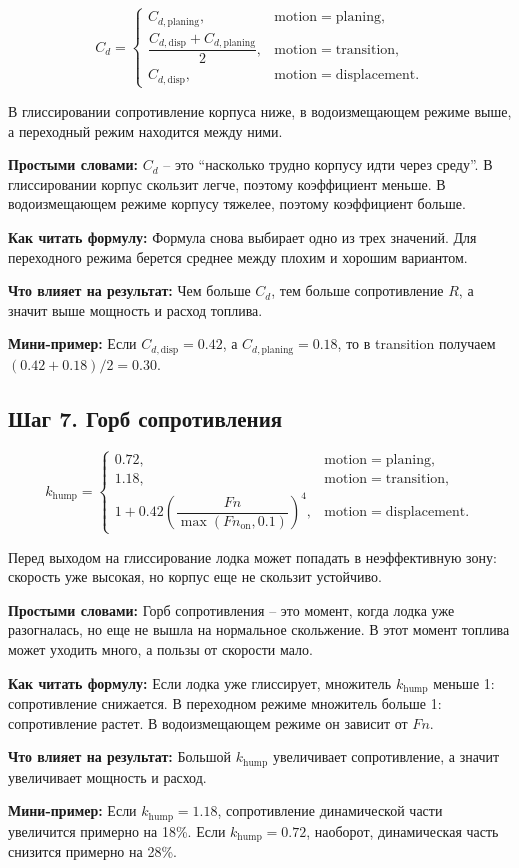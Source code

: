 \documentclass[12pt,a4paper]{article}
\newcommand{\simple}[1]{\par\smallskip\noindent\textbf{Простыми словами:} #1\par}
\newcommand{\howto}[1]{\par\smallskip\noindent\textbf{Как читать формулу:} #1\par}
\newcommand{\effect}[1]{\par\smallskip\noindent\textbf{Что влияет на результат:} #1\par}
\newcommand{\exampletext}[1]{\par\smallskip\noindent\textbf{Мини-пример:} #1\par}
\begin{document}
\begin{equation}
C_d =
\begin{cases}
C_{d,\mathrm{planing}}, & \mathrm{motion}=\mathrm{planing}, \\
\dfrac{C_{d,\mathrm{disp}} + C_{d,\mathrm{planing}}}{2},
& \mathrm{motion}=\mathrm{transition}, \\
C_{d,\mathrm{disp}}, & \mathrm{motion}=\mathrm{displacement}.
\end{cases}
\end{equation}

В глиссировании сопротивление корпуса ниже, в водоизмещающем режиме выше,
а переходный режим находится между ними.

\simple{\(C_d\) -- это ``насколько трудно корпусу идти через среду''. В
глиссировании корпус скользит легче, поэтому коэффициент меньше. В
водоизмещающем режиме корпусу тяжелее, поэтому коэффициент больше.}
\howto{Формула снова выбирает одно из трех значений. Для переходного режима
берется среднее между плохим и хорошим вариантом.}
\effect{Чем больше \(C_d\), тем больше сопротивление \(R\), а значит выше
мощность и расход топлива.}
\exampletext{Если \(C_{d,\mathrm{disp}}=0.42\), а
\(C_{d,\mathrm{planing}}=0.18\), то в transition получаем
\((0.42+0.18)/2=0.30\).}

\subsection{Шаг 7. Горб сопротивления}

\begin{equation}
k_{\mathrm{hump}} =
\begin{cases}
0.72, & \mathrm{motion}=\mathrm{planing}, \\
1.18, & \mathrm{motion}=\mathrm{transition}, \\
1 + 0.42\left(\dfrac{Fn}{\max(Fn_{\mathrm{on}},0.1)}\right)^4,
& \mathrm{motion}=\mathrm{displacement}.
\end{cases}
\end{equation}

Перед выходом на глиссирование лодка может попадать в неэффективную зону:
скорость уже высокая, но корпус еще не скользит устойчиво.

\simple{Горб сопротивления -- это момент, когда лодка уже разогналась, но еще
не вышла на нормальное скольжение. В этот момент топлива может уходить много,
а пользы от скорости мало.}
\howto{Если лодка уже глиссирует, множитель \(k_{\mathrm{hump}}\) меньше 1:
сопротивление снижается. В переходном режиме множитель больше 1:
сопротивление растет. В водоизмещающем режиме он зависит от \(Fn\).}
\effect{Большой \(k_{\mathrm{hump}}\) увеличивает сопротивление, а значит
увеличивает мощность и расход.}
\exampletext{Если \(k_{\mathrm{hump}}=1.18\), сопротивление динамической части
увеличится примерно на 18\%. Если \(k_{\mathrm{hump}}=0.72\), наоборот,
динамическая часть снизится примерно на 28\%.}
\end{document}
